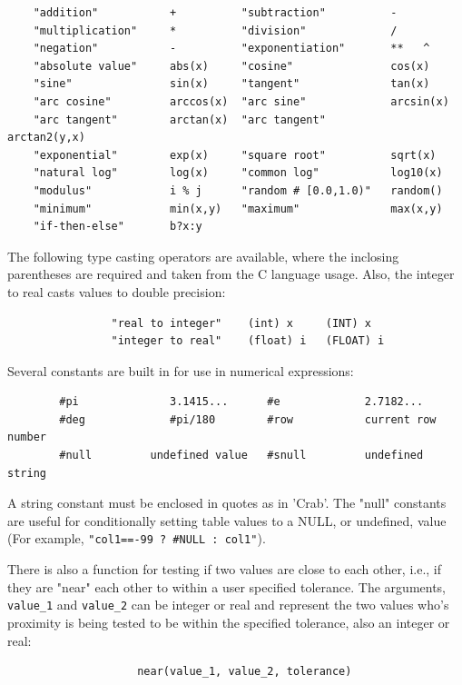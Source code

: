 \documentclass[11pt]{article}
\begin{document}
 
\begin{verbatim}
    "addition"           +          "subtraction"          -
    "multiplication"     *          "division"             /
    "negation"           -          "exponentiation"       **   ^
    "absolute value"     abs(x)     "cosine"               cos(x)
    "sine"               sin(x)     "tangent"              tan(x)
    "arc cosine"         arccos(x)  "arc sine"             arcsin(x)
    "arc tangent"        arctan(x)  "arc tangent"          arctan2(y,x)
    "exponential"        exp(x)     "square root"          sqrt(x)
    "natural log"        log(x)     "common log"           log10(x)
    "modulus"            i % j      "random # [0.0,1.0)"   random()
    "minimum"            min(x,y)   "maximum"              max(x,y)
    "if-then-else"       b?x:y
\end{verbatim}


The  following  type  casting  operators  are  available,  where the
inclosing parentheses are required and taken  from  the  C  language
usage. Also, the integer to real casts values to double precision:

\begin{verbatim}
                "real to integer"    (int) x     (INT) x
                "integer to real"    (float) i   (FLOAT) i
\end{verbatim}


Several constants are built in  for  use  in  numerical
expressions:

 
\begin{verbatim}
        #pi              3.1415...      #e             2.7182...
        #deg             #pi/180        #row           current row number
        #null         undefined value   #snull         undefined string
\end{verbatim}

A  string constant must  be enclosed  in quotes  as in  'Crab'.  The
"null" constants  are useful for conditionally  setting table values to
a NULL, or undefined, value (For example,  {\tt "col1==-99 ? \#NULL :
col1"}).

There is also a function for testing if  two  values  are  close  to
each  other,  i.e.,  if  they are "near" each other to within a user
specified tolerance. The  arguments,  {\tt value\_1}  and  {\tt value\_2}  can  be
integer  or  real  and  represent  the two values who's proximity is
being tested to be within the specified tolerance, also  an  integer
or real:

\begin{verbatim}
                    near(value_1, value_2, tolerance)
\end{verbatim}
\end{document}
